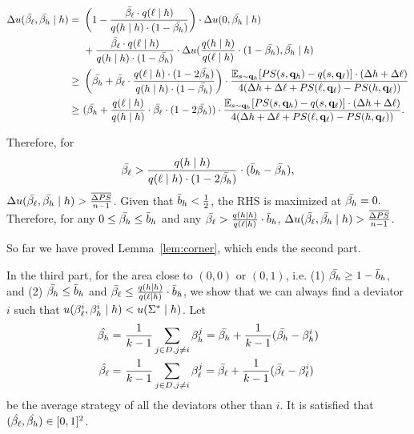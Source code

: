 \begin{align*}
    \Delta u(\bar{\beta_{\ell}}, \bar{\beta_{h}} \mid h) = &\ \left (1 -\frac{\bar{\beta_{\ell}} \cdot q(\ell\mid h)}{q(h\mid h)\cdot ( 1- \bar{\beta_{h}})}\right)\cdot \Delta u(0, \bar{\beta_{h}} \mid h)\\
    &\ +  \frac{\bar{\beta_{\ell}} \cdot q(\ell\mid h)}{q(h\mid h)\cdot ( 1- \bar{\beta_{h}})} \cdot \Delta u(\frac{q(h\mid h)}{q(\ell \mid h)} \cdot (1 - \bar{\beta_{h}}), \bar{\beta_{h}} \mid h)\\
    \ge &\ \left( \bar{\beta_{h}} + \bar{\beta_{\ell}}\cdot \frac{q(\ell \mid h)\cdot (1 - 2\bar{\beta_{h}})}{q(h\mid h)\cdot (1 - \bar{\beta_{h}})}\right)\cdot\frac{\mathbb{E}_{s \sim \mathbf{q}_h}[PS(s, \mathbf{q}_h) - q(s, \mathbf{q}_\ell)]\cdot (\Delta h + \Delta \ell)}{4 (\Delta h + \Delta \ell + PS(\ell, \mathbf{q}_{\ell}) - PS(h, \mathbf{q}_\ell))}\\
    \ge &\ (\bar{\beta_{h}} + \frac{q(\ell \mid h)}{q(h\mid h)} \cdot \bar{\beta_{\ell}} \cdot (1 - 2\bar{\beta_{h}})) \cdot\frac{\mathbb{E}_{s \sim \mathbf{q}_h}[PS(s, \mathbf{q}_h) - q(s, \mathbf{q}_\ell)]\cdot (\Delta h + \Delta \ell)}{4 (\Delta h + \Delta \ell + PS(\ell, \mathbf{q}_{\ell}) - PS(h, \mathbf{q}_\ell))}.
\end{align*}

Therefore, for
\begin{equation*}
    \bar{\beta_{\ell}} > \frac{q(h\mid h)}{q(\ell \mid h)\cdot (1 - 2\bar{\beta_{h}})} \cdot (\bar{b}_h - \bar{\beta_{h}}),
\end{equation*}
$\Delta u(\bar{\beta_{\ell}}, \bar{\beta_{h}}\mid h) > \frac{\overline{\Delta PS}}{n - 1}$. Given that $\bar{b}_h < \frac12$, the RHS is maximized at $\bar{\beta_{h}} = 0.$ 
Therefore, for any $0\le \bar{\beta_{h}} \le \bar{b}_h$ and any $\bar{\beta_{\ell}} > \frac{q(h\mid h)}{q(\ell \mid h)}\cdot \bar{b}_h$, $\Delta u(\bar{\beta_{\ell}}, \bar{\beta_{h}}\mid h) > \frac{\overline{\Delta PS}}{n - 1}$. 

So far we have proved Lemma~\ref{lem:corner}, which ends the second part.

In the third part, for the area close to $(0,0)$ or $(0, 1)$, i.e. (1) $\bar{\beta_{h}} \ge 1 - \bar{b}_h$, and (2) $\bar{\beta_{h}} \le \bar{b}_h$ and $\bar{\beta_{\ell}} \le \frac{q(h \mid h)}{q(\ell \mid h)} \cdot \bar{b}_h$, we show that we can always find a deviator $i$ such that $u(\beta_{\ell}^i, \beta_{h}^i \mid h) < u(\Sigma^* \mid h)$. 
Let 
\begin{align*}
  \hat{\beta_{h}} = &\ \frac{1}{k - 1} \sum_{j\in D, j\neq i} \beta_{h}^j  = \bar{\beta_{h}} + \frac{1}{k - 1} (\bar{\beta_{h}} - \beta_{h}^i)\\
  \hat{\beta_{\ell}} = &\ \frac{1}{k - 1} \sum_{j\in D, j\neq i} \beta_{\ell}^j  = \bar{\beta_{\ell}} + \frac{1}{k - 1} (\bar{\beta_{\ell}} - \beta_{\ell}^i)
\end{align*} 
be the average strategy of all the deviators other than $i$. It is satisfied that $(\hat{\beta_{\ell}}, \hat{\beta_{h}}) \in [0, 1]^2$.

